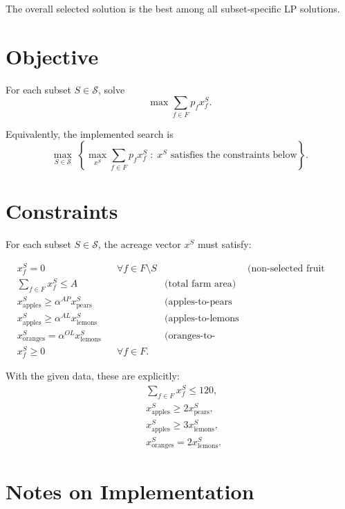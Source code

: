 The overall selected solution is the best among all subset-specific LP solutions.

\section*{Objective}

For each subset $S \in \mathcal{S}$, solve
\[
\max \sum_{f \in F} p_f x_f^{S}.
\]

Equivalently, the implemented search is
\[
\max_{S \in \mathcal{S}} \;
\left\{
\max_{x^{S}} \sum_{f \in F} p_f x_f^{S}
\;:\;
x^{S} \text{ satisfies the constraints below}
\right\}.
\]

\section*{Constraints}

For each subset $S \in \mathcal{S}$, the acreage vector $x^{S}$ must satisfy:

\begin{align}
&x_f^{S}=0 &&\forall f \in F \setminus S
&&\text{(non-selected fruit types fixed to zero)} \\
&\sum_{f \in F} x_f^{S} \le A
&&&\text{(total farm area)} \\
&x_{\text{apples}}^{S} \ge \alpha^{AP} x_{\text{pears}}^{S}
&&&\text{(apples-to-pears ratio)} \\
&x_{\text{apples}}^{S} \ge \alpha^{AL} x_{\text{lemons}}^{S}
&&&\text{(apples-to-lemons ratio)} \\
&x_{\text{oranges}}^{S} = \alpha^{OL} x_{\text{lemons}}^{S}
&&&\text{(oranges-to-lemons ratio)} \\
&x_f^{S} \ge 0 &&\forall f \in F.
\end{align}

With the given data, these are explicitly:
\begin{align}
&\sum_{f \in F} x_f^{S} \le 120,\\
&x_{\text{apples}}^{S} \ge 2x_{\text{pears}}^{S},\\
&x_{\text{apples}}^{S} \ge 3x_{\text{lemons}}^{S},\\
&x_{\text{oranges}}^{S} = 2x_{\text{lemons}}^{S}.
\end{align}

\section*{Notes on Implementation}

